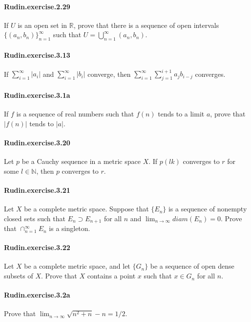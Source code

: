 \documentclass{article}
\begin{document}
\paragraph{Rudin.exercise.2.29} If $U$ is an open set in $\mathbb{R}$, prove that there is a sequence of open intervals $\{(a_n, b_n)\}_{n=1}^\infty$ such that $U=\bigcup_{n=1}^\infty (a_n, b_n)$.

\paragraph{Rudin.exercise.3.13} If $\sum_{i=1}^\infty |a_i|$ and $\sum_{i=1}^\infty |b_i|$ converge, then $\sum_{i=1}^\infty \sum_{j=1}^{i+1} a_jb_{i-j}$ converges.

\paragraph{Rudin.exercise.3.1a} If $f$ is a sequence of real numbers such that $f(n)$ tends to a limit $a$, prove that $|f(n)|$ tends to $|a|$.

\paragraph{Rudin.exercise.3.20} Let $p$ be a Cauchy sequence in a metric space $X$. If $p(lk)$ converges to $r$ for some $l\in\mathbb{N}$, then $p$ converges to $r$.

\paragraph{Rudin.exercise.3.21} Let $X$ be a complete metric space. Suppose that $\{E_n\}$ is a sequence of nonempty closed sets such that $E_n\supset E_{n+1}$ for all $n$ and $\lim_{n\to\infty} diam(E_n)=0$. Prove that $\cap_{n=1}^\infty E_n$ is a singleton.

\paragraph{Rudin.exercise.3.22} Let $X$ be a complete metric space, and let $\{G_n\}$ be a sequence of open dense subsets of $X$. Prove that $X$ contains a point $x$ such that $x\in G_n$ for all $n$.

\paragraph{Rudin.exercise.3.2a} Prove that $\lim_{n\to\infty} \sqrt{n^2+n} - n = 1/2$.
\end{document}
